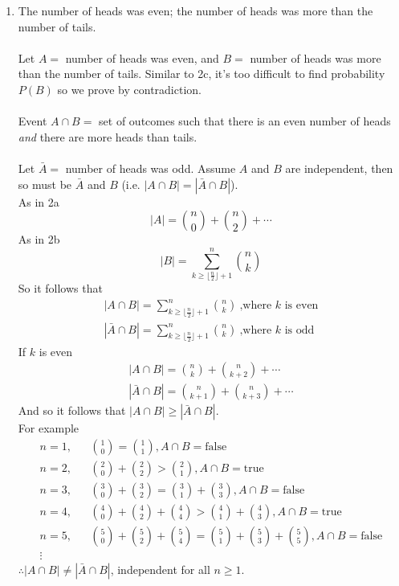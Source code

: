\documentclass[10pt,a4paper,final]{article}
\begin{document}
\begin{enumerate}
\begin{enumerate}
\item The number of heads was even; the number of heads was more than the number of tails. \\
\\
Let $A = $ number of heads was even, and $B =$ number of heads was more than the number of tails.
Similar to 2c, it's too difficult to find probability $P(B)$ so we prove by contradiction. \\
\\
Event $A \cap B =$ set of outcomes such that there is an even number of heads \emph{and}
there are more heads than tails. \\
\\
Let $\bar{A} =$ number of heads was odd.
Assume $A$ and $B$ are independent, then so must be $\bar{A}$ and $B$
(i.e. $|A \cap B| = |\bar{A} \cap B|$).\\

As in 2a
\begin{equation*}
|A| = \binom{n}{0} + \binom{n}{2} + \cdots
\end{equation*}
As in 2b
\begin{equation*}
|B| = \sum_{k \geq \lfloor \frac{n}{2} \rfloor + 1}^n \binom{n}{k}
\end{equation*}
So it follows that
\begin{eqnarray*}
|A \cap B| = \sum_{k \geq \lfloor \frac{n}{2} \rfloor + 1}^n \binom{n}{k} \: \mbox{,where $k$ is even}\\
|\bar{A} \cap B| = \sum_{k \geq \lfloor \frac{n}{2} \rfloor + 1}^n \binom{n}{k} \: \mbox{,where $k$ is odd}
\end{eqnarray*}
If $k$ is even
\begin{eqnarray*}
|A \cap B| = \binom{n}{k} + \binom{n}{k+2} + \cdots \\
|\bar{A} \cap B| = \binom{n}{k+1} +\binom{n}{k+3} + \cdots
\end{eqnarray*}
And so it follows that $|A \cap B| \geq |\bar{A} \cap B|$.\\
For example
\begin{eqnarray*}
n = 1, & &\binom{1}{0} = \binom{1}{1}, A \cap B = \mbox{false}\\
n = 2, & &\binom{2}{0} + \binom{2}{2} > \binom{2}{1}, A \cap B = \mbox{true}\\
n = 3, & &\binom{3}{0} + \binom{3}{2} = \binom{3}{1} + \binom{3}{3}, A \cap B = \mbox{false}\\
n = 4, & &\binom{4}{0} + \binom{4}{2} + \binom{4}{4} > \binom{4}{1} + \binom{4}{3}, A \cap B = \mbox{true}\\
n = 5, & &\binom{5}{0} + \binom{5}{2} + \binom{5}{4} = \binom{5}{1} + \binom{5}{3} + \binom{5}{5}, A \cap B = \mbox{false}\\
\vdots
\end{eqnarray*}
$\therefore |A \cap B| \neq |\bar{A} \cap B|$, independent for all $n \geq 1$.
\end{enumerate}


\end{enumerate}
\end{document}
